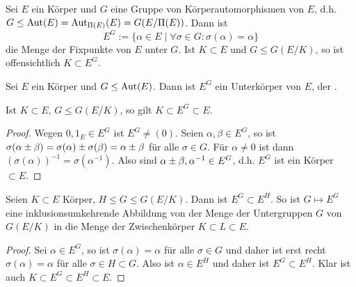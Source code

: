 \begin{df} \label{19.4-8}
	Sei $E$ ein Körper und $G$ eine Gruppe von Körperautomorphismen von $E$, d.h. $G \le \operatorname{Aut}(E) = \operatorname{Aut}_{\Pi(E)}(E) = G(E / \Pi(E))$.
	Dann ist
	\[
		E^G := \{\alpha \in E \;|\; \forall \sigma \in G : \sigma(\alpha) = \alpha\}
	\]
	die Menge der Fixpunkte von $E$ unter $G$.
	Ist $K \subset E$ und $G \le G(E / K)$, so ist offensichtlich $K \subset E^G$.
\end{df}

\begin{lem} \label{19.4-9}
	Sei $E$ ein Körper und $G \le \operatorname{Aut}(E)$.
	Dann ist $E^G$ ein Unterkörper von $E$, der .
	\begin{note}
		Ist $K \subset E$, $G \le G(E / K)$, so gilt $K \subset E^G \subset E$.
	\end{note}
	\begin{proof}
		Wegen $0, 1_E \in E^G$ ist $E^G \neq (0)$.
		Seien $\alpha, \beta \in E^G$, so ist $\sigma(\alpha \pm \beta) = \sigma(\alpha) \pm \sigma(\beta) = \alpha \pm \beta$ für alle $\sigma \in G$.
		Für $\alpha \neq 0$ ist dann $(\sigma(\alpha))^{-1} = \sigma(\alpha^{-1})$.
		Also sind $\alpha \pm \beta, \alpha^{-1} \in E^G$, d.h. $E^G$ ist ein Körper $\subset E$.
	\end{proof}
\end{lem}

\begin{lem} \label{19.4-10}
	Seien $K \subset E$ Körper, $H \le G \le G(E / K)$.
	Dann ist $E^G \subset E^H$.
	So ist $G \mapsto E^G$ eine inklusionsumkehrende Abbildung von der Menge der Untergruppen $G$ von $G(E / K)$ in die Menge der Zwischenkörper $K \subset L \subset E$.
	\begin{proof}
		Sei $\alpha \in E^G$, so ist $\sigma(\alpha) = \alpha$ für alle $\sigma \in G$ und daher ist erst recht $\sigma(\alpha) = \alpha$ für alle $\sigma \in H \subset G$.
		Also ist $\alpha \in E^H$ und daher ist $E^G \subset E^H$.
		Klar ist auch $K \subset E^G \subset E^H \subset E$.
	\end{proof}
\end{lem}

